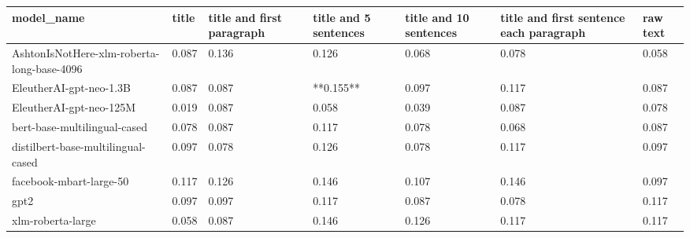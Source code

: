 \begin{tabular}{lllllll}
\toprule
                                model\_name & title & title and first paragraph & title and 5 sentences & title and 10 sentences & title and first sentence each paragraph & raw text \\
\midrule
AshtonIsNotHere-xlm-roberta-long-base-4096 & 0.087 &                     0.136 &                 0.126 &                  0.068 &                                   0.078 &    0.058 \\
                   EleutherAI-gpt-neo-1.3B & 0.087 &                     0.087 &             **0.155** &                  0.097 &                                   0.117 &    0.087 \\
                   EleutherAI-gpt-neo-125M & 0.019 &                     0.087 &                 0.058 &                  0.039 &                                   0.087 &    0.078 \\
              bert-base-multilingual-cased & 0.078 &                     0.087 &                 0.117 &                  0.078 &                                   0.068 &    0.087 \\
        distilbert-base-multilingual-cased & 0.097 &                     0.078 &                 0.126 &                  0.078 &                                   0.117 &    0.097 \\
                   facebook-mbart-large-50 & 0.117 &                     0.126 &                 0.146 &                  0.107 &                                   0.146 &    0.097 \\
                                      gpt2 & 0.097 &                     0.097 &                 0.117 &                  0.087 &                                   0.078 &    0.117 \\
                         xlm-roberta-large & 0.058 &                     0.087 &                 0.146 &                  0.126 &                                   0.117 &    0.117 \\
\bottomrule
\end{tabular}
